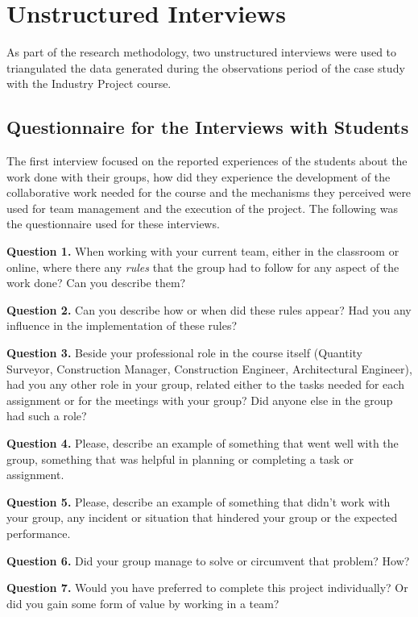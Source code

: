 \chapter{Unstructured Interviews \label{appendix:c}}

As part of the research methodology, two unstructured interviews were used to triangulated the data generated during the observations period of the case study with the Industry Project
course.

\section{Questionnaire for the Interviews with Students \label{sec:C-1}}

The first interview focused on the reported experiences of the students about the work done with their groups, how did they experience the development of the collaborative work needed for
the course and the mechanisms they perceived were used for team management and the execution of the project. The following was the questionnaire used for these interviews.

\textbf{Question 1.} When working with your current team, either in the classroom or online, where there any \emph{rules} that the group had to follow for any aspect of the work done? Can
you describe them?

\textbf{Question 2.} Can you describe how or when did these rules appear? Had you any influence in the implementation of these rules?

\textbf{Question 3.} Beside your professional role in the course itself (Quantity Surveyor, Construction Manager, Construction Engineer, Architectural Engineer), had you any other role in
your group, related either to the tasks needed for each assignment or for the meetings with your group? Did anyone else in the group had such a role?

\textbf{Question 4.} Please, describe an example of something that went well with the group, something that was helpful in planning or completing a task or assignment.

\textbf{Question 5.} Please, describe an example of something that didn't work with your group, any incident or situation that hindered your group or the expected performance.

\textbf{Question 6.} Did your group manage to solve or circumvent that problem? How?

\textbf{Question 7.} Would you have preferred to complete this project individually? Or did you gain some form of value by working in a team?

